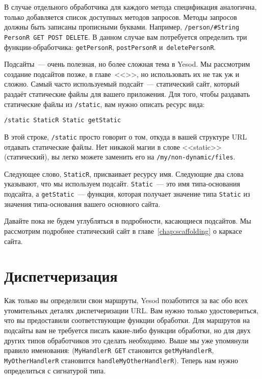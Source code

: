 В случае отдельного обработчика для каждого метода спецификация аналогична,
только добавляется список доступных методов запросов. Методы запросов
должны быть записаны прописными буквами. Например,
\lstinline!/person/#String PersonR GET POST DELETE!.
В данном случае вам потребуется определить три функции-обработчика:
\lstinline!getPersonR!, \lstinline!postPersonR! и~\lstinline!deletePersonR!.

Подсайты~--- очень полезная, но более сложная тема в Yesod. Мы рассмотрим
создание подсайтов позже, в главе~<<>>,
но использовать их не так уж и сложно. Самый
часто используемый подсайт~--- статический сайт, который
раздаёт статические файлы для вашего приложения. Для того, чтобы
раздавать статические файлы из \lstinline!/static!, вам нужно описать
ресурс вида:
\begin{verbatim}
/static StaticR Static getStatic
\end{verbatim}

В этой строке, \lstinline!/static! просто говорит о том, откуда в вашей
структуре URL отдавать статические файлы. Нет никакой магии в слове
<<static>> (статический), вы легко можете заменить его на
\lstinline!/my/non-dynamic/files!.

Следующее слово, \lstinline!StaticR!, присваивает ресурсу имя. Следующие два слова
указывают, что мы используем подсайт. \lstinline!Static!~--- это имя
типа-основания подсайта, а \lstinline!getStatic!~--- функция, которая получает
значение типа \lstinline!Static! из значения типа-основания вашего основного сайта.

Давайте пока не будем углубляться в подробности, касающиеся подсайтов. Мы рассмотрим
подробнее статический сайт в главе~\ref{chap:scaffolding} о каркасе сайта.

\section{Диспетчеризация}
Как только вы определили свои маршруты, Yesod позаботится за вас обо всех
утомительных деталях диспетчеризации URL. Вам нужно только
удостовериться, что вы предоставили соответствующие функции
обработки. Для маршрутов на подсайты вам не требуется писать
какие-либо функции обработки, но для двух других типов обработчиков
это сделать необходимо. Выше мы уже упомянули правило именования:
(\lstinline!MyHandlerR GET! становится \lstinline!getMyHandlerR!,
\lstinline!MyOtherHandlerR! становится \lstinline!handleMyOtherHandlerR!).
Теперь нам нужно определиться с сигнатурой типа.

